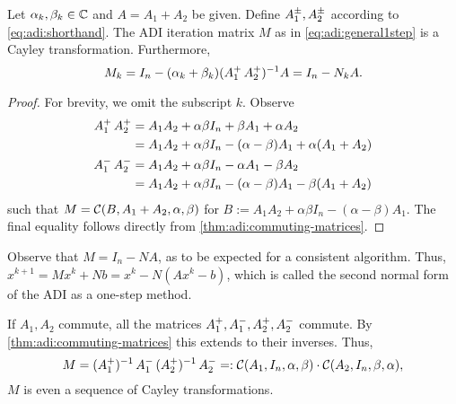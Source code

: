\begin{lemma}
\label{thm:adi:2nf}
  Let $\alpha_k,\beta_k\in\mathbb{C}$ and $A=A_1+A_2$ be given.
  Define $\mathop{A_1^\pm}, \mathop{A_2^\pm}$ according to \eqref{eq:adi:shorthand}.
  The \ac{ADI} iteration matrix $M$ as in \eqref{eq:adi:general1step} is a Cayley transformation.
  Furthermore,
  \begin{equation*}
    M_k
    = I_n - (\alpha_k + \beta_k) (\mathop{A_1^+}\mathop{A_2^+})^{-1} A
    = I_n - N_k A
    .
  \end{equation*}
\end{lemma}
\begin{proof}
  For brevity, we omit the subscript $k$.
  Observe
  \begin{align*}
    \mathop{A_1^+}\mathop{A_2^+}
    &= A_1A_2 + \alpha\beta I_n + \beta A_1 + \alpha A_2 \\
    &= A_1A_2 + \alpha\beta I_n - (\alpha-\beta)A_1 + \alpha(A_1 + A_2) \\
    \mathop{A_1^-}\mathop{A_2^-}
    &= A_1A_2 + \alpha\beta I_n - \alpha A_1 - \beta A_2 \\
    &= A_1A_2 + \alpha\beta I_n - (\alpha-\beta)A_1 - \beta(A_1 + A_2)
  \end{align*}
  such that
  $M = \mathcal{C}(B, A_1+A_2, \alpha, \beta)$ for
  $
    B := A_1A_2 + \alpha\beta I_n - (\alpha-\beta)A_1
  $.
  The final equality follows directly from \autoref{thm:adi:commuting-matrices}.
\end{proof}

\begin{remark}
  Observe that $M = I_n - NA$,
  as to be expected for a consistent algorithm.
  Thus, $x^{k+1} = Mx^k + Nb = x^k - N(Ax^k - b)$,
  which is called
  the second normal form of the \ac{ADI} as a one-step method.
\end{remark}

If $A_1, A_2$ commute,
all the matrices $\mathop{A_1^+},\mathop{A_1^-},\mathop{A_2^+},\mathop{A_2^-}$ commute.
By \autoref{thm:adi:commuting-matrices} this extends to their inverses.
Thus,
\begin{equation*}
  M =
  \mathop{(\mathop{A_1^+})^{-1}}\mathop{A_1^-}
  \mathop{(\mathop{A_2^+})^{-1}}\mathop{A_2^-}
  =:
  \mathcal{C}(A_1, I_n, \alpha, \beta)
  \cdot
  \mathcal{C}(A_2, I_n, \beta, \alpha)
  ,
\end{equation*}
\ie $M$ is even a sequence of Cayley transformations.

